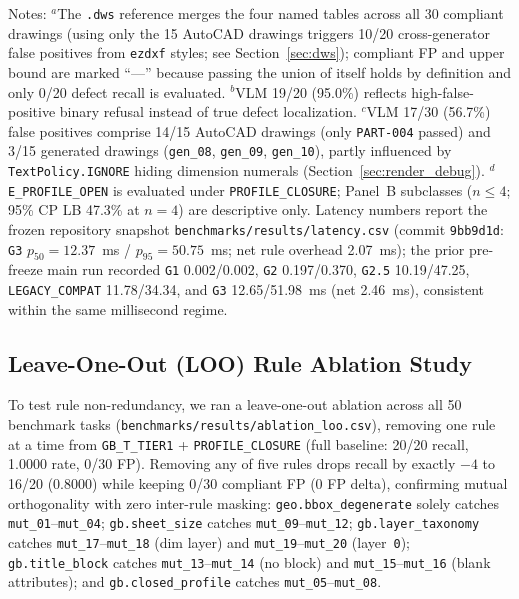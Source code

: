 \documentclass[nocopyright,nolists,upint,varvw,hyphenate]{asmejour}
\begin{document}
\begin{table}[t]
\begin{minipage}{\textwidth}
\par\smallskip\footnotesize
Notes: $^{a}$The \texttt{.dws} reference merges the four named tables across all 30 compliant drawings (using only the 15 AutoCAD drawings triggers 10/20 cross-generator false positives from \texttt{ezdxf} styles; see Section~\ref{sec:dws}); compliant FP and upper bound are marked ``---'' because passing the union of itself holds by definition and only 0/20 defect recall is evaluated. $^{b}$VLM 19/20 (95.0\%) reflects high-false-positive binary refusal instead of true defect localization. $^{c}$VLM 17/30 (56.7\%) false positives comprise 14/15 AutoCAD drawings (only \texttt{PART-004} passed) and 3/15 generated drawings (\texttt{gen\_08}, \texttt{gen\_09}, \texttt{gen\_10}), partly influenced by \texttt{TextPolicy.IGNORE} hiding dimension numerals (Section~\ref{sec:render_debug}). $^{d}$\texttt{E\_PROFILE\_OPEN} is evaluated under \texttt{PROFILE\_CLOSURE}; Panel~B subclasses ($n \le 4$; 95\% CP LB 47.3\% at $n=4$) are descriptive only. Latency numbers report the frozen repository snapshot \texttt{benchmarks/results/latency.csv} (commit \texttt{9bb9d1d}: \texttt{G3} $p_{50}=12.37$~ms / $p_{95}=50.75$~ms; net rule overhead 2.07~ms); the prior pre-freeze main run recorded \texttt{G1} 0.002/0.002, \texttt{G2} 0.197/0.370, \texttt{G2.5} 10.19/47.25, \texttt{LEGACY\_COMPAT} 11.78/34.34, and \texttt{G3} 12.65/51.98~ms (net 2.46~ms), consistent within the same millisecond regime.
\end{minipage}
\end{table}

\subsection{Leave-One-Out (LOO) Rule Ablation Study}\label{sec:loo}

To test rule non-redundancy, we ran a leave-one-out ablation across all 50 benchmark tasks (\texttt{benchmarks/results/ablation\_loo.csv}), removing one rule at a time from \texttt{GB\_T\_TIER1} + \texttt{PROFILE\_CLOSURE} (full baseline: 20/20 recall, 1.0000 rate, 0/30 FP). Removing any of five rules drops recall by exactly $-4$ to 16/20 (0.8000) while keeping 0/30 compliant FP (0 FP delta), confirming mutual orthogonality with zero inter-rule masking: \texttt{geo.bbox\_degenerate} solely catches \texttt{mut\_01}--\texttt{mut\_04}; \texttt{gb.sheet\_size} catches \texttt{mut\_09}--\texttt{mut\_12}; \texttt{gb.layer\_taxonomy} catches \texttt{mut\_17}--\texttt{mut\_18} (dim layer) and \texttt{mut\_19}--\texttt{mut\_20} (layer~\texttt{0}); \texttt{gb.title\_block} catches \texttt{mut\_13}--\texttt{mut\_14} (no block) and \texttt{mut\_15}--\texttt{mut\_16} (blank attributes); and \texttt{gb.closed\_profile} catches \texttt{mut\_05}--\texttt{mut\_08}.
\end{document}
